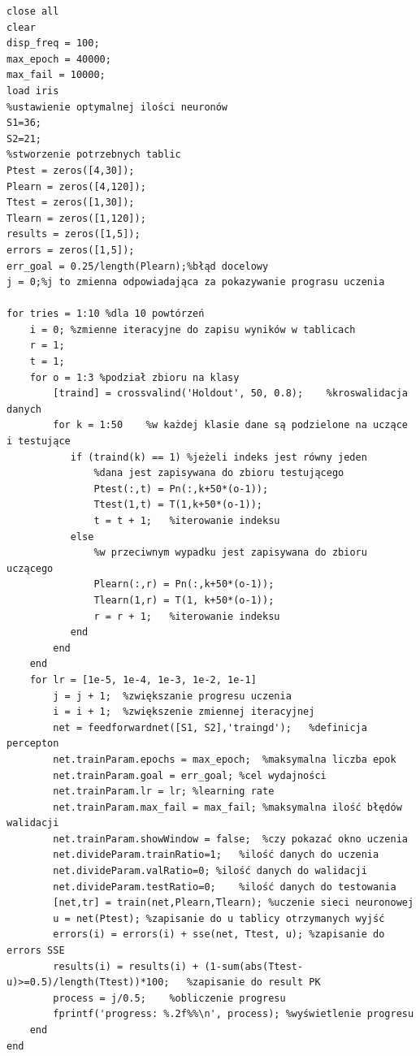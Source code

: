 \documentclass[a4paper, 12pt]{article}
\begin{document}
\begin{lstlisting}[frame=single, caption=Skrypt do analizy dotyczącej wpływu wartości współczynnika uczenia przy ustalonej ilości neuronów na uczenie sieci]
%wyczyszczenia środowiska i ustawienie wartości początkowych
close all
clear
disp_freq = 100;
max_epoch = 40000;
max_fail = 10000;
load iris
%ustawienie optymalnej ilości neuronów
S1=36;
S2=21;
%stworzenie potrzebnych tablic
Ptest = zeros([4,30]);
Plearn = zeros([4,120]);
Ttest = zeros([1,30]);
Tlearn = zeros([1,120]);
results = zeros([1,5]);
errors = zeros([1,5]);
err_goal = 0.25/length(Plearn);%błąd docelowy
j = 0;%j to zmienna odpowiadająca za pokazywanie prograsu uczenia

for tries = 1:10 %dla 10 powtórzeń
    i = 0; %zmienne iteracyjne do zapisu wyników w tablicach
    r = 1;
    t = 1;
    for o = 1:3 %podział zbioru na klasy
        [traind] = crossvalind('Holdout', 50, 0.8);    %kroswalidacja danych
        for k = 1:50    %w każdej klasie dane są podzielone na uczące i testujące
           if (traind(k) == 1) %jeżeli indeks jest równy jeden
               %dana jest zapisywana do zbioru testującego
               Ptest(:,t) = Pn(:,k+50*(o-1));
               Ttest(1,t) = T(1,k+50*(o-1));
               t = t + 1;   %iterowanie indeksu
           else
               %w przeciwnym wypadku jest zapisywana do zbioru uczącego
               Plearn(:,r) = Pn(:,k+50*(o-1));
               Tlearn(1,r) = T(1, k+50*(o-1));
               r = r + 1;   %iterowanie indeksu
           end
        end
    end
    for lr = [1e-5, 1e-4, 1e-3, 1e-2, 1e-1]
        j = j + 1;  %zwiększanie progresu uczenia
        i = i + 1;  %zwiększenie zmiennej iteracyjnej
        net = feedforwardnet([S1, S2],'traingd');   %definicja percepton
        net.trainParam.epochs = max_epoch;  %maksymalna liczba epok
        net.trainParam.goal = err_goal; %cel wydajności
        net.trainParam.lr = lr; %learning rate
        net.trainParam.max_fail = max_fail; %maksymalna ilość błędów walidacji
        net.trainParam.showWindow = false;  %czy pokazać okno uczenia
        net.divideParam.trainRatio=1;   %ilość danych do uczenia
        net.divideParam.valRatio=0; %ilość danych do walidacji
        net.divideParam.testRatio=0;    %ilość danych do testowania
        [net,tr] = train(net,Plearn,Tlearn); %uczenie sieci neuronowej
        u = net(Ptest); %zapisanie do u tablicy otrzymanych wyjść
        errors(i) = errors(i) + sse(net, Ttest, u); %zapisanie do errors SSE
        results(i) = results(i) + (1-sum(abs(Ttest-u)>=0.5)/length(Ttest))*100;   %zapisanie do result PK
        process = j/0.5;    %obliczenie progresu
        fprintf('progress: %.2f%%\n', process); %wyświetlenie progresu
    end
end


\end{lstlisting}
\end{document}

